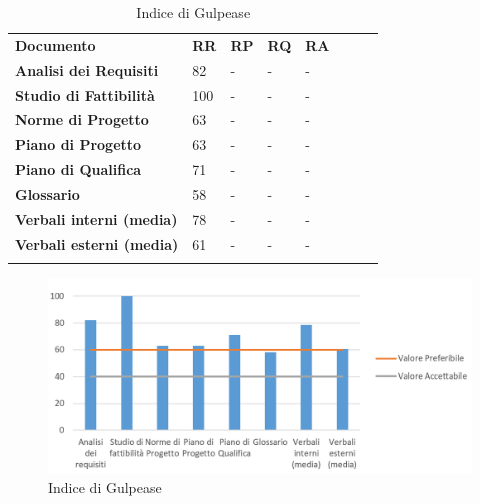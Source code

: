 \begin{longtable} {						
		>{}p{50mm}  		
		>{}p{8mm}		
		>{}p{8mm}		
		>{}p{8mm}		
		>{}p{8mm}		
		>{}p{8mm}		
		>{}p{8mm}
		>{}p{8mm}				
	}			
	\rowcolor{gray!50}
	\textbf{Documento} & \textbf{RR} & \textbf{RP} & \textbf{RQ} & \textbf{RA} \TBstrut \\ [2mm]
	\textbf{Analisi dei Requisiti} & 82 & - & - & - \TBstrut \\ [2mm]
	\textbf{Studio di Fattibilità} & 100 & - & - & - \TBstrut \\ [2mm]
	\textbf{Norme di Progetto} & 63 & - & - & - \TBstrut \\ [2mm]
	\textbf{Piano di Progetto} & 63 & - & - & - \TBstrut \\ [2mm]
	\textbf{Piano di Qualifica} & 71 & - & - & - \TBstrut \\ [2mm]
	\textbf{Glossario} & 58 & - & - & - \TBstrut \\ [2mm]
	\textbf{Verbali interni (media)} & 78 & - & - & - \TBstrut \\ [2mm]
	\textbf{Verbali esterni (media)}& 61 & - & - & - \TBstrut \\ [2mm]
	\rowcolor{white}
	\caption{Indice di Gulpease}
\end{longtable}
\begin{figure}[H] 	
	\includegraphics[width=\linewidth]{./img/grafici/1.png}	
	\caption{Indice di Gulpease}	
\end{figure}